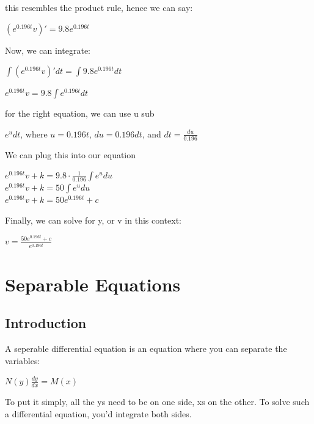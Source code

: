 \documentclass{article}
\begin{document}
this resembles the product rule, hence we can say:

\begin{center}
    $(e^{0.196t} v)' = 9.8e^{0.196t}$
\end{center}

Now, we can integrate:

\begin{center}
    $\int(e^{0.196t} v)' dt = \int9.8e^{0.196t} dt$
\end{center}

\begin{center}
    $e^{0.196t} v = 9.8\int e^{0.196t}dt$ 
\end{center}

for the right equation, we can use u sub

\begin{center}
    $e^{u} dt$, where $u = 0.196t$, $du = 0.196dt$, and $dt = \frac{du}{0.196}$
\end{center}

We can plug this into our equation

\begin{center}
    $e^{0.196t} v + k = 9.8 \cdot \frac{1}{0.196} \int e^{u} du$ \\
    $e^{0.196t} v + k = 50 \int e^{u} du$ \\
    $e^{0.196t} v + k = 50 e^{0.196t} + c$
\end{center}

Finally, we can solve for y, or v in this context:

\begin{center}
    $ v = \frac{50 e^{0.196t} + c}{e^{0.196t}}$
\end{center}

\section{Separable Equations}
\subsection{Introduction}
A seperable differential equation is an equation where you can separate the variables:
\begin{center}
    $N(y) \frac{dy}{dx} = M(x)$
\end{center}

To put it simply, all the ys need to be on one side, xs on the other. To solve such a differential equation, you'd integrate both sides.
\end{document}
